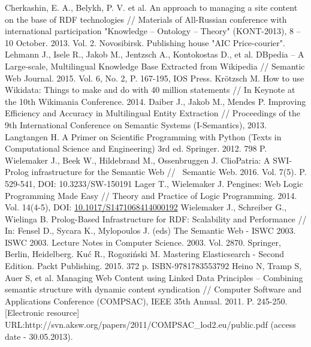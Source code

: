 \documentclass[12pt]{llncs}
\begin{document}
\begin{thebibliography}{99}
  Cherkashin, E. A., Belykh, P. V. et al. An approach to managing a site
  content on the base of RDF technologies // Materials of All-Russian
  conference with international participation "Knowledge -- Ontology --
  Theory" (KONT-2013), 8 -- 10 October. 2013. Vol. 2. Novosibirsk.
  Publishing house "AIC Price-courier".
  Lehmann J., Isele R., Jakob M., Jentzsch A., Kontokostas D., et al.
  DBpedia -- A Large-scale, Multilingual Knowledge Base Extracted from
  Wikipedia // Semantic Web Journal. 2015. Vol. 6, No. 2, P. 167-195,
  IOS Press.
  Krötzsch M. How to use Wikidata: Things to make and do with 40 million
  statements // In Keynote at the 10th Wikimania Conference. 2014.
  Daiber J., Jakob M., Mendes P. Improving Efficiency and Accuracy in
  Multilingual Entity Extraction // Proceedings of the 9th International
  Conference on Semantic Systems (I-Semantics), 2013.
  Langtangen H. A Primer on Scientific Programming with Python (Texts in
  Computational Science and Engineering) 3rd ed. Springer. 2012. 798 P.
  Wielemaker J., Beek W., Hildebrand M., Ossenbruggen J. ClioPatria: A
  SWI-Prolog infrastructure for the Semantic Web //  Semantic Web. 2016.
  Vol. 7(5). P. 529-541, DOI: 10.3233/SW-150191
  Lager T., Wielemaker J. Pengines: Web Logic Programming Made Easy //
  Theory and Practice of Logic Programming. 2014. Vol. 14(4-5),
DOI: \url{10.1017/S1471068414000192}
  Wielemaker J., Schreiber G., Wielinga B. Prolog-Based Infrastructure
  for RDF: Scalability and Performance // In: Fensel D., Sycara K.,
  Mylopoulos J. (eds) The Semantic Web - ISWC 2003. ISWC 2003. Lecture
  Notes in Computer Science. 2003. Vol. 2870. Springer, Berlin,
  Heidelberg.
  Kuć R., Rogoziński M. Mastering Elasticsearch - Second Edition. Packt
  Publishing. 2015. 372 p. ISBN-9781783553792
  Heino N, Tramp S, Auer S, et al. Managing Web Content using Linked
  Data Principles -- Combining semantic structure with dynamic content
  syndication // Computer Software and Applications Conference
  (COMPSAC), IEEE 35th Annual. 2011. P. 245-250. [Electronic
  resource]
  URL:http://svn.aksw.org/papers/2011/COMPSAC\_lod2.eu/public.pdf
  (access date - 30.05.2013).
\end{thebibliography}
\end{document}
